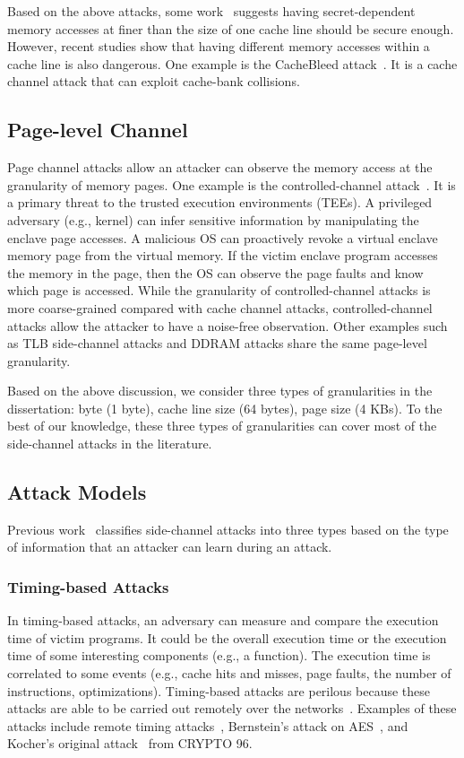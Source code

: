 Based on the above attacks, some work~\cite{brickell2011technologies} suggests having secret-dependent memory accesses at finer than the size of one cache line should be secure enough. However, recent studies show that having different memory accesses within a cache line is also dangerous. One example is the CacheBleed attack~\cite{yarom2017cachebleed}. It is a cache channel attack that can exploit cache-bank collisions. 
\subsection{Page-level Channel}
Page channel attacks allow an attacker can observe the memory access at the granularity of memory pages. One example is the controlled-channel attack~\cite{xu2015controlled}. It is a primary threat to the trusted execution environments (TEEs).  A privileged adversary (e.g., kernel) can infer sensitive information by manipulating the enclave page accesses. A malicious OS can proactively revoke a virtual enclave memory page from the virtual memory. If the victim enclave program accesses the memory in the  page, then the OS can observe the page faults and know which page is accessed. While the granularity of controlled-channel attacks is more coarse-grained compared with cache channel attacks, controlled-channel attacks allow the attacker to have a noise-free observation. Other examples such as TLB side-channel attacks and DDRAM attacks share the same page-level granularity.


Based on the above discussion, we consider three types of granularities in the dissertation: byte (1 byte), cache line size (64 bytes), page size (4 KBs). To the best of our knowledge, these three types of granularities can cover most of the side-channel attacks in the literature.


\subsection{Attack Models}
Previous work~\cite{182946} classifies side-channel attacks into three types based on the type of information that an attacker can learn during an attack.
\subsubsection*{Timing-based Attacks}
In timing-based attacks, an adversary can measure and compare the execution time of victim programs. It could be the overall execution time or the execution time of some interesting components (e.g., a function).  The execution time is correlated to some events (e.g., cache hits and misses, page faults, the number of instructions, optimizations). Timing-based attacks are perilous because these attacks are able to be carried out remotely over the networks~\cite{brumley2005remote}. Examples of these attacks include remote timing attacks~\cite{brumley2005remote}, Bernstein's attack on AES~\cite{bernstein2005cache}, and Kocher’s original attack~\cite{kocher1996timing} from CRYPTO 96.
